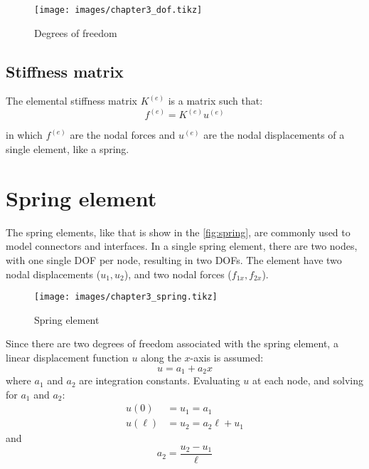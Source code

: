 \begin{figure}[!htbp]
    \caption{Degrees of freedom}
    \label{fig:dof}
    \centering
    \vspace{1em}
    \texttt{[image: images/chapter3\_dof.tikz]}
\end{figure}

\subsection{Stiffness matrix}

The elemental stiffness matrix $K^{(e)}$ is a matrix such that:
%
\begin{equation}
    f^{(e)} = K^{(e)} u^{(e)}
\end{equation}

in which $f^{(e)}$ are the nodal forces and $u^{(e)}$ are the nodal displacements of a single element, like a spring.

\section{Spring element}

The spring elements, like that is show in the \autoref{fig:spring}, are commonly used to model connectors and interfaces. In a single spring element, there are two nodes, with one single DOF per node, resulting in two DOFs. The element have two nodal displacements ($u_1, u_2$), and two nodal forces ($f_{1x}, f_{2x}$).

\begin{figure}[!htbp]
    \caption{Spring element}
    \label{fig:spring}
    \centering
    \vspace{1em}
    \texttt{[image: images/chapter3\_spring.tikz]}
\end{figure}


Since there are two degrees of freedom associated with the spring element, a linear displacement function $u$ along the $x$-axis is assumed:
%
\begin{equation}
\label{eq:u}
    u = a_1 + a_2 x
\end{equation}
%
where $a_1$ and $a_2$ are integration constants. Evaluating $u$ at each node, and solving for $a_1$ and $a_2$:
%
\begin{align}
\label{eq:a1}
    u(0) &= u_1 = a_1 \\
    u(\ell) &= u_2 = a_2 \ell + u_1
\end{align}
%
and
%
\begin{equation}
\label{eq:a2}
    a_2 = \dfrac{u_2 - u_1}{\ell}
\end{equation}

